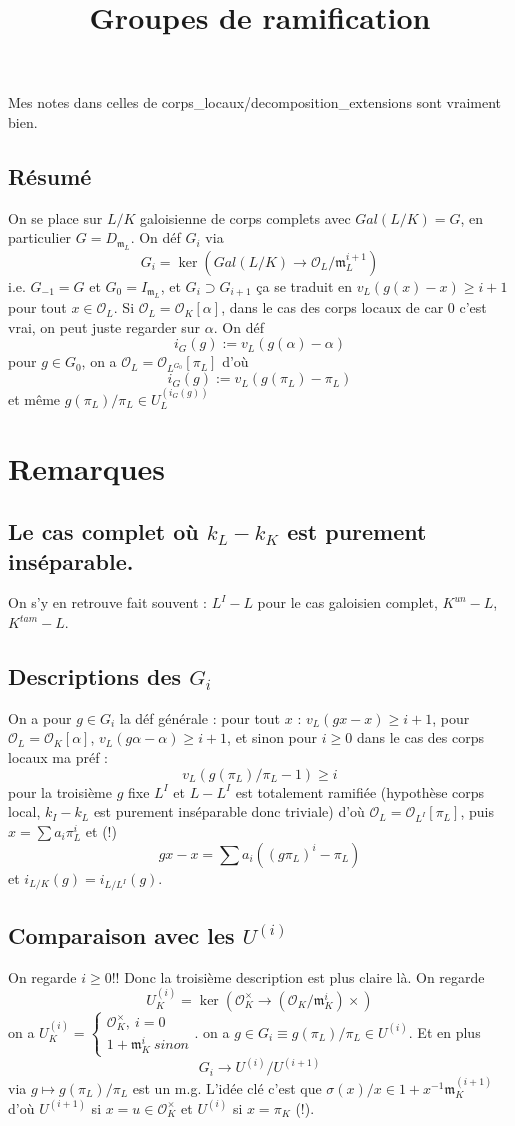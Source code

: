 \documentclass[a4paper,12pt]{book}
\title{Groupes de ramification}
\date{}
\newcommand{\Or}{\mathcal{O}}
\newcommand{\m}{\mathfrak m}
\theoremstyle{plain}
\theoremstyle{definition}
\theoremstyle{remark}
\begin{document}
\maketitle
Mes notes dans celles de corps\_locaux/decomposition\_extensions
sont vraiment bien. 

\section{Résumé}
On se place sur $L/K$ galoisienne de corps complets avec 
$Gal(L/K)=G$, en particulier $G=D_{\m_L}$. On déf $G_i$ via 
\[G_i=\ker(Gal(L/K)\to \Or_L/\m_L^{i+1})\]
i.e. $G_{-1}=G$ et $G_0=I_{\m_L}$, et $G_i\supset G_{i+1}$ ça se
traduit en
$v_L(g(x)-x)\geq i+1$ pour tout $x\in \Or_L$. Si
$\Or_L=\Or_K[\alpha]$, dans le cas des corps locaux de car $0$ 
c'est vrai, on peut juste regarder sur $\alpha$. On déf
\[i_G(g):=v_L(g(\alpha)-\alpha)\]
pour $g\in G_0$, on a $\Or_L=\Or_{L^{G_0}}[\pi_L]$ d'où 
\[i_G(g):=v_L(g(\pi_L)-\pi_L)\]
et même $g(\pi_L)/\pi_L\in U_L^{(i_G(g))}$


\chapter{Remarques}
\section{Le cas complet où $k_L-k_K$ est purement inséparable.}
On s'y en retrouve fait souvent : $L^I-L$ pour le cas galoisien
complet, $K^{un}-L$, $K^{tam}-L$. 
\section{Descriptions des $G_i$}
On a pour $g\in G_i$ la déf générale : pour tout $x$ : 
$v_L(gx-x)\geq i+1$, pour $\Or_L=\Or_K[\alpha]$, 
$v_L(g\alpha-\alpha)\geq i+1 $, et sinon pour $i\geq 0$ dans
le cas des corps locaux ma préf :
\[v_L(g(\pi_L)/\pi_L-1)\geq i\]
pour la troisième $g$ fixe $L^I$ et $L-L^I$ est totalement ramifiée
(hypothèse corps local, $k_I-k_L$ est purement inséparable donc
triviale) d'où $\Or_L=\Or_{L^I}[\pi_L]$, puis $x=\sum a_i\pi_L^i$
et (!)
\[gx-x=\sum a_i((g\pi_L)^i -\pi_L)\]
et $i_{L/K}(g)=i_{L/L^I}(g)$.

\section{Comparaison avec les $U^{(i)}$}
On regarde $i\geq 0$!!
Donc la troisième description est plus claire là. On regarde 
\[U_K^{(i)}=\ker(\Or_K^\times\to (\Or_K/\m_K^i)\times)\]
on a 
$U_K^{(i)}=\begin{cases} \Or_K^\times,~i=0\\ 1+\m_K^i~sinon\end{cases}$.
on a $g\in G_i\equiv g(\pi_L)/\pi_L\in U^{(i)}$. Et en plus
\[G_i\to U^{(i)}/U^{(i+1)}\]
via $g\mapsto g(\pi_L)/\pi_L$ est un m.g. L'idée clé c'est que
$\sigma(x)/x\in 1+x^{-1}\m_K^{(i+1)}$ d'où $U^{(i+1)}$ si
$x=u\in \Or_K^\times$ et $U^{(i)}$ si $x=\pi_K$ (!).
\end{document}
